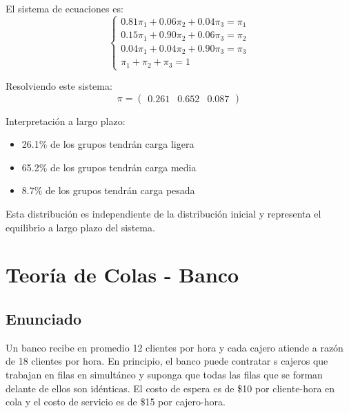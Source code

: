 \documentclass[12pt]{article}
\begin{document}
El sistema de ecuaciones es:
\[
\begin{cases}
0.81\pi_1 + 0.06\pi_2 + 0.04\pi_3 = \pi_1 \\
0.15\pi_1 + 0.90\pi_2 + 0.06\pi_3 = \pi_2 \\
0.04\pi_1 + 0.04\pi_2 + 0.90\pi_3 = \pi_3 \\
\pi_1 + \pi_2 + \pi_3 = 1
\end{cases}
\]

Resolviendo este sistema:
\[
\pi = \begin{pmatrix} 0.261 & 0.652 & 0.087 \end{pmatrix}
\]

Interpretación a largo plazo:
\begin{itemize}
    \item 26.1\% de los grupos tendrán carga ligera
    \item 65.2\% de los grupos tendrán carga media
    \item 8.7\% de los grupos tendrán carga pesada
\end{itemize}

Esta distribución es independiente de la distribución inicial y representa el equilibrio a largo plazo del sistema.

\section{Teoría de Colas - Banco}

\subsection{Enunciado}
Un banco recibe en promedio 12 clientes por hora y cada cajero atiende a razón de 18 clientes por hora. En principio, el banco puede contratar s cajeros que trabajan en filas en simultáneo y suponga que todas las filas que se forman delante de ellos son idénticas. El costo de espera es de \$10 por cliente-hora en cola y el costo de servicio es de \$15 por cajero-hora.
\end{document}
